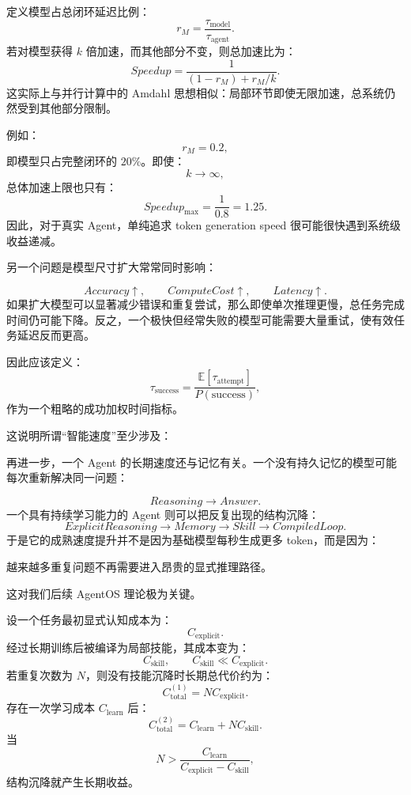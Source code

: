 定义模型占总闭环延迟比例：
\[
r_M
=
\frac{
\tau_{\mathrm{model}}
}{
\tau_{\mathrm{agent}}
}.
\]
若对模型获得 $k$ 倍加速，而其他部分不变，则总加速比为：
\[
Speedup
=
\frac{
1
}{
(1-r_M)+r_M/k
}.
\]
这实际上与并行计算中的 Amdahl 思想相似：局部环节即使无限加速，总系统仍然受到其他部分限制。

例如：
\[
r_M=0.2,
\]
即模型只占完整闭环的 $20\%$。即使：
\[
k\rightarrow\infty,
\]
总体加速上限也只有：
\[
Speedup_{\max}
=
\frac1{0.8}
=
1.25.
\]
因此，对于真实 Agent，单纯追求 token generation speed 很可能很快遇到系统级收益递减。

另一个问题是模型尺寸扩大常常同时影响：

\[
Accuracy\uparrow,
\qquad
ComputeCost\uparrow,
\qquad
Latency\uparrow.
\]
如果扩大模型可以显著减少错误和重复尝试，那么即使单次推理更慢，总任务完成时间仍可能下降。反之，一个极快但经常失败的模型可能需要大量重试，使有效任务延迟反而更高。

因此应该定义：
\[
\tau_{\mathrm{success}}
=
\frac{
\mathbb E[\tau_{\mathrm{attempt}}]
}{
P(\mathrm{success})
},
\]
作为一个粗略的成功加权时间指标。

这说明所谓“智能速度”至少涉及：

\begin{statementbox}
\centering
{}
\end{statementbox}

再进一步，一个 Agent 的长期速度还与记忆有关。一个没有持久记忆的模型可能每次重新解决同一问题：

\[
Reasoning
\rightarrow
Answer.
\]
一个具有持续学习能力的 Agent 则可以把反复出现的结构沉降：
\[
ExplicitReasoning
\rightarrow
Memory
\rightarrow
Skill
\rightarrow
CompiledLoop.
\]
于是它的成熟速度提升并不是因为基础模型每秒生成更多 token，而是因为：

\begin{statementbox}
越来越多重复问题不再需要进入昂贵的显式推理路径。
\end{statementbox}

这对我们后续 AgentOS 理论极为关键。

设一个任务最初显式认知成本为：
\[
C_{\mathrm{explicit}}.
\]
经过长期训练后被编译为局部技能，其成本变为：
\[
C_{\mathrm{skill}},
\qquad
C_{\mathrm{skill}}
\ll
C_{\mathrm{explicit}}.
\]
若重复次数为 $N$，则没有技能沉降时长期总代价约为：
\[
C_{\mathrm{total}}^{(1)}
=
NC_{\mathrm{explicit}}.
\]
存在一次学习成本 $C_{\mathrm{learn}}$ 后：
\[
C_{\mathrm{total}}^{(2)}
=
C_{\mathrm{learn}}
+
NC_{\mathrm{skill}}.
\]
当
\[
N
>
\frac{
C_{\mathrm{learn}}
}{
C_{\mathrm{explicit}}
-
C_{\mathrm{skill}}
},
\]
结构沉降就产生长期收益。

